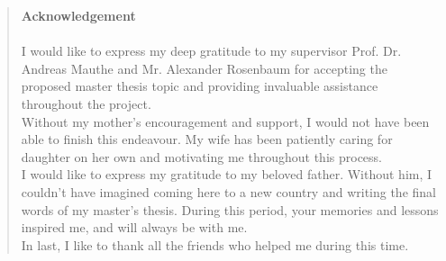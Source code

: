 
\pagestyle{plain}


\begin{quote}
	\textbf{\Large Acknowledgement}\\\\
I would like to express my deep gratitude to my supervisor Prof$.$ Dr$.$ Andreas Mauthe and Mr$.$ Alexander Rosenbaum for accepting the proposed master thesis topic and providing invaluable assistance throughout the project. \\
Without my mother's encouragement and support, I would not have been able to finish this endeavour. My wife has been patiently caring for daughter on her own and motivating me throughout this process. \\
I would like to express my gratitude to my beloved father. Without him, I couldn't have imagined coming here to a new country and writing the final words of my master's thesis. During this period, your memories and lessons inspired me, and will always be with me. \\
In last, I like to thank all the friends who helped me during this time. 
 \end{quote}

